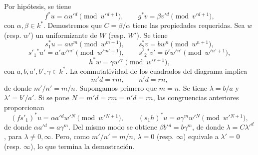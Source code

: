 Por hipótesis, se tiene
\[
f^*u=\alpha u'{}^d\pmod {u'{}^{d+1}},\qquad
g^*v=\beta v'{}^d\pmod {v'{}^{d+1}},
\]
con $\alpha,\beta\in k^*$. Demostremos que $C=\beta/\alpha$ tiene las propiedades requeridas. Sea $w$ (resp. $w'$) un uniformizante de $W$ (resp. $W'$). Se tiene
\[
s_1^*u=aw^m\pmod {w^{m+1}},\qquad
s_2^*v=bw^n\pmod {w^{n+1}},
\]
\[
s'_1{}^*u'=a'w'{}^{m'}\pmod {w'{}^{m'+1}},\qquad
s'_2{}^*v'=b'w'{}^{n'}\pmod {w'{}^{n'+1}},
\]
\[
h^*w=\gamma w'{}^r\pmod {w'{}^{r+1}},
\]
con $a,b,a',b',\gamma\in k^*$. La conmutatividad de los cuadrados del diagrama implica
\[
m'd=rm,\qquad n'd=rn,
\]
de donde $m'/n'=m/n$. Supongamos primero que $m=n$. Se tiene $\lambda=b/a$ y $\lambda'=b'/a'$. Si se pone $N=m'd=rm=n'd=rn$, las congruencias anteriores proporcionan
\[
(fs'_1)^*u=\alpha a'{}^d w'{}^N\pmod {w'{}^{N+1}},\qquad
(s_1h)^*u=a\gamma^m w'{}^N\pmod {w'{}^{N+1}},
\]
de donde $\alpha a'{}^d=a\gamma^m$. Del mismo modo se obtiene $\beta b'{}^d=b\gamma^m$, de donde $\lambda=C{\lambda'}^d$, para $\lambda\ne 0,\infty$. Pero, como $m'/n'=m/n$, $\lambda=0$ (resp. $\infty$) equivale a $\lambda'=0$ (resp. $\infty$), lo que termina la demostración.
